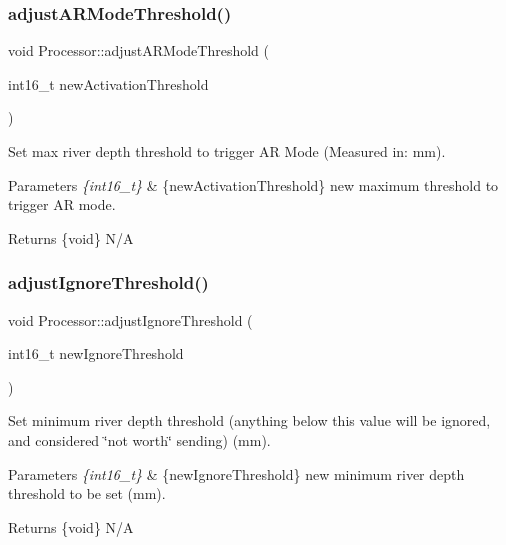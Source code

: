 \subsubsection{\texorpdfstring{adjust\+A\+R\+Mode\+Threshold()}{adjustARModeThreshold()}}
{\footnotesize\ttfamily void Processor\+::adjust\+A\+R\+Mode\+Threshold (\begin{DoxyParamCaption}\item[{int16\+\_\+t}]{new\+Activation\+Threshold }\end{DoxyParamCaption})}

Set max river depth threshold to trigger AR Mode (Measured in\+: mm). 
\begin{DoxyParams}{Parameters}
{\em \{int16\+\_\+t\}} & \{new\+Activation\+Threshold\} new maximum threshold to trigger AR mode. \\
\hline
\end{DoxyParams}
\begin{DoxyReturn}{Returns}
\{void\} N/A 
\end{DoxyReturn}
\mbox{\label{class_processor_a4b4e65040fd7bc17e978412c1af8e0c8}} 
\subsubsection{\texorpdfstring{adjust\+Ignore\+Threshold()}{adjustIgnoreThreshold()}}
{\footnotesize\ttfamily void Processor\+::adjust\+Ignore\+Threshold (\begin{DoxyParamCaption}\item[{int16\+\_\+t}]{new\+Ignore\+Threshold }\end{DoxyParamCaption})}

Set minimum river depth threshold (anything below this value will be ignored, and considered \char`\"{}not worth\char`\"{} sending) (mm). 
\begin{DoxyParams}{Parameters}
{\em \{int16\+\_\+t\}} & \{new\+Ignore\+Threshold\} new minimum river depth threshold to be set (mm). \\
\hline
\end{DoxyParams}
\begin{DoxyReturn}{Returns}
\{void\} N/A 
\end{DoxyReturn}
\mbox{\label{class_processor_a8b550c7a6be09f887291e14392cead11}} 
